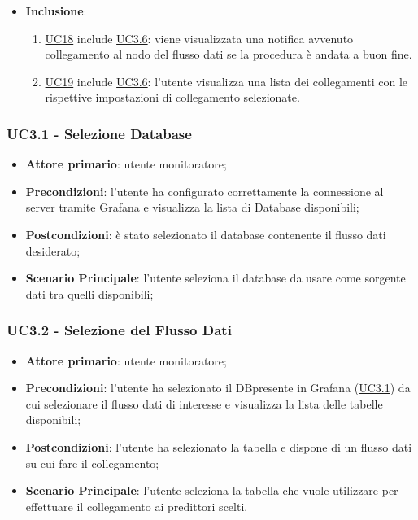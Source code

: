 \begin{itemize}
\begin{enumerate}
				\end{enumerate}
			\item\textbf{Inclusione}:
				\begin{enumerate}
					\item\hyperref[par:UC18]{UC18} include \hyperref[par:UC3.6]{UC3.6}: viene visualizzata una notifica avvenuto collegamento al nodo del flusso dati se la procedura è andata a buon fine.
					\item\hyperref[par:UC19]{UC19} include \hyperref[par:UC3.6]{UC3.6}:  l'utente visualizza una lista dei collegamenti con le rispettive impostazioni di collegamento selezionate.
				\end{enumerate}
		\end{itemize}
		
		\label{par:UC3.1}
		\subsubsection{UC3.1 - Selezione Database}
		\begin{itemize}
			\item\textbf{Attore primario}: utente monitoratore;
			\item\textbf{Precondizioni}: l’utente ha configurato correttamente la connessione al server tramite Grafana e visualizza la lista di Database disponibili;
			\item\textbf{Postcondizioni}: è stato selezionato il database contenente il flusso dati desiderato;
			\item\textbf{Scenario Principale}: l’utente seleziona il database da usare come sorgente dati tra quelli disponibili;
		\end{itemize}
		
		\label{par:UC3.2}
		\subsubsection{UC3.2 - Selezione del Flusso Dati}
		\begin{itemize}
			\item\textbf{Attore primario}: utente monitoratore;
			\item\textbf{Precondizioni}: l’utente ha selezionato il DB\glo presente in Grafana (\hyperref[par:UC3.1]{UC3.1}) da cui selezionare il flusso dati di interesse e visualizza la lista delle tabelle disponibili;
			\item\textbf{Postcondizioni}: l’utente ha selezionato la tabella e dispone di un flusso dati su cui fare il collegamento;
			\item\textbf{Scenario Principale}: l’utente seleziona la tabella che vuole utilizzare per effettuare il collegamento ai predittori scelti.
		\end{itemize}
		
